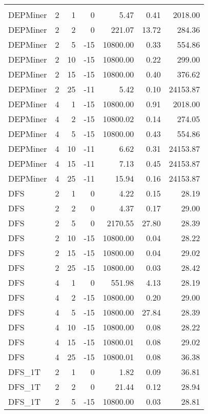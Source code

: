 \begin{center}
\begin{longtable}{lrrrrrr}
\hline\endlastfoot
\\
DEPMiner     & 2 & 1 &   0 & 5.47 & 0.41 & 2018.00 \\ 
  DEPMiner     & 2 & 2 &   0 & 221.07 & 13.72 & 284.36 \\ 
  DEPMiner     & 2 & 5 & -15 & 10800.00 & 0.33 & 554.86 \\ 
  DEPMiner     & 2 & 10 & -15 & 10800.00 & 0.22 & 299.00 \\ 
  DEPMiner     & 2 & 15 & -15 & 10800.00 & 0.40 & 376.62 \\ 
  DEPMiner     & 2 & 25 & -11 & 5.42 & 0.10 & 24153.87 \\ 
  DEPMiner     & 4 & 1 & -15 & 10800.00 & 0.91 & 2018.00 \\ 
  DEPMiner     & 4 & 2 & -15 & 10800.02 & 0.14 & 274.05 \\ 
  DEPMiner     & 4 & 5 & -15 & 10800.00 & 0.43 & 554.86 \\ 
  DEPMiner     & 4 & 10 & -11 & 6.62 & 0.31 & 24153.87 \\ 
  DEPMiner     & 4 & 15 & -11 & 7.13 & 0.45 & 24153.87 \\ 
  DEPMiner     & 4 & 25 & -11 & 15.94 & 0.16 & 24153.87 \\ 
  DFS     & 2 & 1 &   0 & 4.22 & 0.15 & 28.19 \\ 
  DFS     & 2 & 2 &   0 & 4.37 & 0.17 & 29.00 \\ 
  DFS     & 2 & 5 &   0 & 2170.55 & 27.80 & 28.39 \\ 
  DFS     & 2 & 10 & -15 & 10800.00 & 0.04 & 28.22 \\ 
  DFS     & 2 & 15 & -15 & 10800.00 & 0.04 & 29.02 \\ 
  DFS     & 2 & 25 & -15 & 10800.00 & 0.03 & 28.42 \\ 
  DFS     & 4 & 1 &   0 & 551.98 & 4.13 & 28.19 \\ 
  DFS     & 4 & 2 & -15 & 10800.00 & 0.20 & 29.00 \\ 
  DFS     & 4 & 5 & -15 & 10800.00 & 27.84 & 28.39 \\ 
  DFS     & 4 & 10 & -15 & 10800.00 & 0.08 & 28.22 \\ 
  DFS     & 4 & 15 & -15 & 10800.01 & 0.08 & 29.02 \\ 
  DFS     & 4 & 25 & -15 & 10800.01 & 0.08 & 36.38 \\ 
  DFS\_1T     & 2 & 1 &   0 & 1.82 & 0.09 & 36.81 \\ 
  DFS\_1T     & 2 & 2 &   0 & 21.44 & 0.12 & 28.94 \\ 
  DFS\_1T     & 2 & 5 & -15 & 10800.00 & 0.03 & 28.81 \\ 

\end{longtable}
\end{center}
